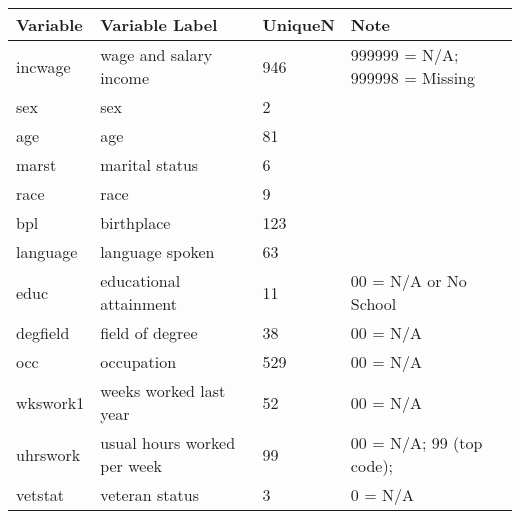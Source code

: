 \begin{table}[h!]
    \centering
    \begin{tabular}{|l|l|l|l|}
    \hline
    Variable & Variable Label              & UniqueN & Note                           \\ \hline
    incwage  & wage and salary income      & 946     & 999999 = N/A; 999998 = Missing \\ \hline
    sex      & sex                         & 2       &                                \\ \hline
    age      & age                       & 81      &                                \\ \hline
    marst    & marital status              & 6       &                                \\ \hline
    race     & race                        & 9       &                                \\ \hline
    bpl      & birthplace                  & 123     &                                \\ \hline
    language & language spoken             & 63      &                                \\ \hline
    educ     & educational attainment      & 11      & 00 = N/A or No School          \\ \hline
    degfield & field of degree             & 38      & 00 = N/A                       \\ \hline
    occ      & occupation                  & 529     & 00 = N/A                       \\ \hline
    wkswork1 & weeks worked last year      & 52      & 00 = N/A                       \\ \hline
    uhrswork & usual hours worked per week & 99      & 00 = N/A; 99 (top code);       \\ \hline
    vetstat  & veteran status              & 3       & 0 = N/A                        \\ \hline
    \end{tabular}
    \end{table}